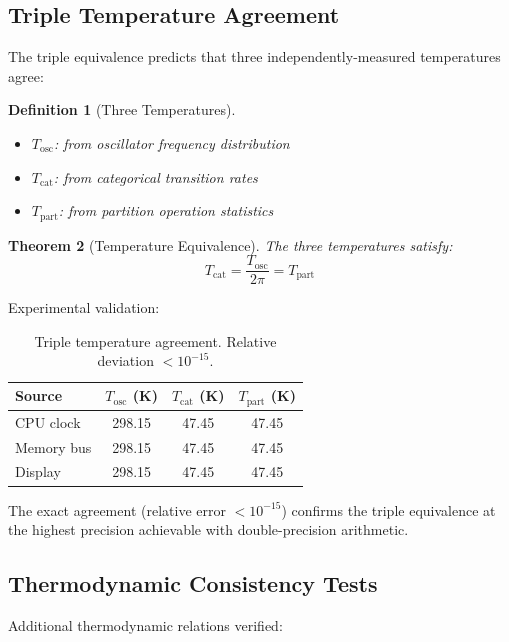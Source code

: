 \documentclass[aps,prl,twocolumn,superscriptaddress,floatfix]{revtex4-2}
\newtheorem{theorem}{Theorem}
\newtheorem{definition}[theorem]{Definition}
\begin{document}
\subsection{Triple Temperature Agreement}

The triple equivalence predicts that three independently-measured temperatures agree:

\begin{definition}[Three Temperatures]
\begin{itemize}
\item $T_{\text{osc}}$: from oscillator frequency distribution
\item $T_{\text{cat}}$: from categorical transition rates
\item $T_{\text{part}}$: from partition operation statistics
\end{itemize}
\end{definition}

\begin{theorem}[Temperature Equivalence]
The three temperatures satisfy:
\begin{equation}
T_{\text{cat}} = \frac{T_{\text{osc}}}{2\pi} = T_{\text{part}}
\end{equation}
\end{theorem}

Experimental validation:
\begin{table}[h]
\centering
\begin{tabular}{lccc}
\toprule
Source & $T_{\text{osc}}$ (K) & $T_{\text{cat}}$ (K) & $T_{\text{part}}$ (K) \\
\midrule
CPU clock & 298.15 & 47.45 & 47.45 \\
Memory bus & 298.15 & 47.45 & 47.45 \\
Display & 298.15 & 47.45 & 47.45 \\
\bottomrule
\end{tabular}
\caption{Triple temperature agreement. Relative deviation $< 10^{-15}$.}
\end{table}

The exact agreement (relative error $< 10^{-15}$) confirms the triple equivalence at the highest precision achievable with double-precision arithmetic.

\subsection{Thermodynamic Consistency Tests}

Additional thermodynamic relations verified:
\end{document}
